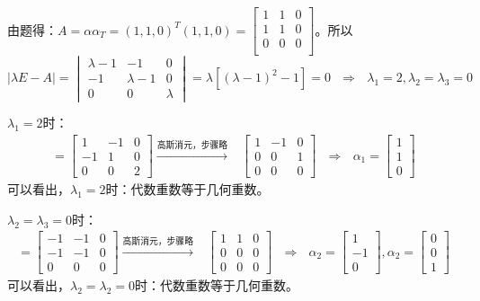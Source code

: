 \documentclass{article}
\begin{document}
\begin{jie}
由题得：$A=\alpha\alpha_{T}=(1,1,0)^{T}(1,1,0)=
\begin{bmatrix}
  1 & 1 & 0 \\
  1 & 1 & 0 \\
   0 & 0 & 0 \\
\end{bmatrix}
$。所以
\begin{equation*}
|\lambda E-A|=
\begin{vmatrix}
  \lambda-1 & -1 & 0 \\
  -1 & \lambda-1 & 0 \\
   0 & 0 & \lambda
\end{vmatrix}=\lambda[(\lambda-1)^2-1]=0~~~\Rightarrow~~~\lambda_{1}=2,\lambda_{2}=\lambda_3=0
\end{equation*}

$\lambda_{1}=2$时：
\begin{align*}
[\lambda E-A]=
\begin{bmatrix}
  1 & -1 & 0 \\
  -1 & 1 & 0 \\
   0 & 0 & 2
\end{bmatrix}
\xrightarrow{\text{高斯消元，步骤略}}&
{
\begin{bmatrix}
  1 & -1 & 0 \\
  0 & 0 & 1 \\
   0 & 0 & 0
\end{bmatrix}
}~~~\Rightarrow~~~\alpha_{1}=
\begin{bmatrix}
  1  \\
   1 \\
    0
\end{bmatrix}
\end{align*}
可以看出，$\lambda_1=2$时：代数重数等于几何重数。

$\lambda_{2}=\lambda_3=0$时：
\begin{align*}
[\lambda E-A]=
\begin{bmatrix}
  -1 & -1 & 0 \\
  -1 & -1 & 0 \\
   0 & 0 & 0
\end{bmatrix}
\xrightarrow{\text{高斯消元，步骤略}}&
{
\begin{bmatrix}
  1 & 1 & 0 \\
  0 & 0 & 0 \\
   0 & 0 & 0
\end{bmatrix}
}~~~\Rightarrow~~~\alpha_{2}=
\begin{bmatrix}
  1  \\
   -1 \\
    0
\end{bmatrix},
\alpha_{2}=
\begin{bmatrix}
0  \\
0 \\
1
\end{bmatrix}
\end{align*}
可以看出，$\lambda_2=\lambda_2=0$时：代数重数等于几何重数。


\end{jie}
\end{document}
